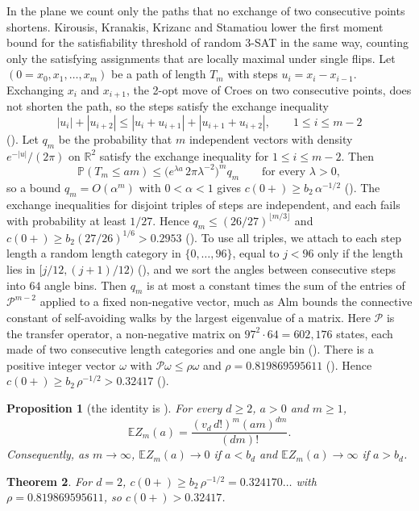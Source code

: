 \documentclass[11pt]{article}
\newtheorem{theorem}{Theorem}[section]
\newtheorem{proposition}[theorem]{Proposition}
\theoremstyle{remark}
\newcommand{\R}{\mathbb{R}}
\newcommand{\E}{\mathbb{E}}
\newcommand{\Prob}{\mathbb{P}}
\begin{document}
In the plane we count only the paths that no exchange of two consecutive points shortens. Kirousis, Kranakis,
Krizanc and Stamatiou \cite{KKKS} lower the first moment bound for the satisfiability threshold of random $3$-SAT in
the same way, counting only the satisfying assignments that are locally maximal under single flips. Let $(0=x_0,x_1,\dots,x_m)$ be a
path of length $T_m$ with steps $u_i=x_i-x_{i-1}$. Exchanging $x_i$ and $x_{i+1}$, the 2-opt move of Croes
\cite{Croes} on two consecutive points, does not shorten the path, so the steps satisfy the exchange inequality
\[
|u_i|+|u_{i+2}|\le|u_i+u_{i+1}|+|u_{i+1}+u_{i+2}|,\qquad 1\le i\le m-2
\]
(). Let $q_m$ be the probability that $m$ independent vectors with density $e^{-|u|}/(2\pi)$ on $\R^2$
satisfy the exchange inequality for $1\le i\le m-2$. Then
\[
\Prob(T_m\le am)\le\bigl(e^{\lambda a}\,2\pi\lambda^{-2}\bigr)^m q_m\qquad\text{for every }\lambda>0,
\]
so a bound $q_m=O(\alpha^m)$ with $0<\alpha<1$ gives $c(0+)\ge b_2\,\alpha^{-1/2}$ (). The
exchange inequalities for disjoint triples of steps are independent, and each fails with probability at least $1/27$.
Hence $q_m\le(26/27)^{\lfloor m/3\rfloor}$ and $c(0+)\ge b_2(27/26)^{1/6}>0.2953$ (). To use all
triples, we attach to each step length a random length category in $\{0,\dots,96\}$, equal to $j<96$ only if the
length lies in $[j/12,(j+1)/12)$ (), and we sort the angles between consecutive steps into $64$
angle bins. Then $q_m$ is at most a constant times the sum of the
entries of $\mathcal P^{m-2}$ applied to a fixed non-negative vector, much as Alm \cite{Alm} bounds the connective constant of
self-avoiding walks by the largest eigenvalue of a matrix. Here $\mathcal P$ is the transfer operator, a non-negative matrix
on $97^2\cdot 64=602{,}176$ states, each made of two consecutive length categories and one angle bin
(). There is a positive integer vector $\omega$ with $\mathcal P\omega\le\rho\omega$
and $\rho=0.819869595611$ (). Hence $c(0+)\ge b_2\,\rho^{-1/2}>0.32417$ ().

\begin{proposition}[{the identity is \cite[Corollary~8]{Carlsson}}]\label{thm:first}
For every $d\ge 2$, $a>0$ and $m\ge 1$,
\[
\E Z_m(a)=\frac{(v_d\,d!)^m(am)^{dm}}{(dm)!}.
\]
Consequently, as $m\to\infty$, $\E Z_m(a)\to 0$ if $a<b_d$ and $\E Z_m(a)\to\infty$ if $a>b_d$.
\end{proposition}

\begin{theorem}\label{thm:main}
For $d=2$, $c(0+)\ge b_2\,\rho^{-1/2}=0.324170\dots$ with $\rho=0.819869595611$, so $c(0+)>0.32417$.
\end{theorem}
\end{document}
